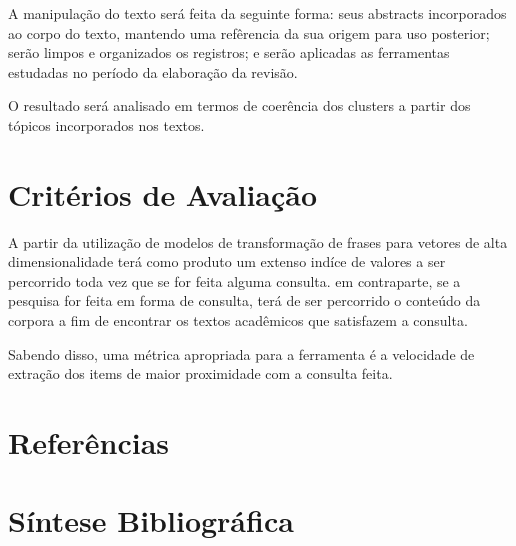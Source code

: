\documentclass[
	12pt,				%
	a4paper,			%
	english,			%
	brazil,				%
	]{article}
\begin{document}
    A manipula\c c\~ ao do texto ser\' a feita da seguinte forma: seus abstracts incorporados ao corpo do texto, mantendo uma refêrencia da sua origem para uso posterior; ser\~ ao limpos e organizados os registros; e ser\~ ao aplicadas as ferramentas estudadas no período da elabora\c c\~ ao da revis\~ ao.

    O resultado ser\' a analisado em termos de coerência dos clusters a partir dos tópicos incorporados nos textos.

\section{Crit\' erios de Avalia\c c\~ ao} 


A partir da utilização de modelos de transforma\c c\~ ao de frases
para vetores de alta dimensionalidade ter\' a como produto um extenso
indíce de valores a ser percorrido toda vez que se for feita alguma consulta.
em contraparte, se a pesquisa for feita em forma de consulta,
terá de ser percorrido o conteúdo da corpora a fim de encontrar
os textos acadêmicos que satisfazem a consulta.

Sabendo disso, uma métrica apropriada para a ferramenta é a velocidade de
extração dos items de maior proximidade com a consulta feita.






\renewcommand\refname{}
\section{Refer\^ encias}

    \vspace{-4.3em}
    
    
\section{S\' intese Bibliogr\' afica}

    \vspace{-3.5em}
    
 
\end{document}
